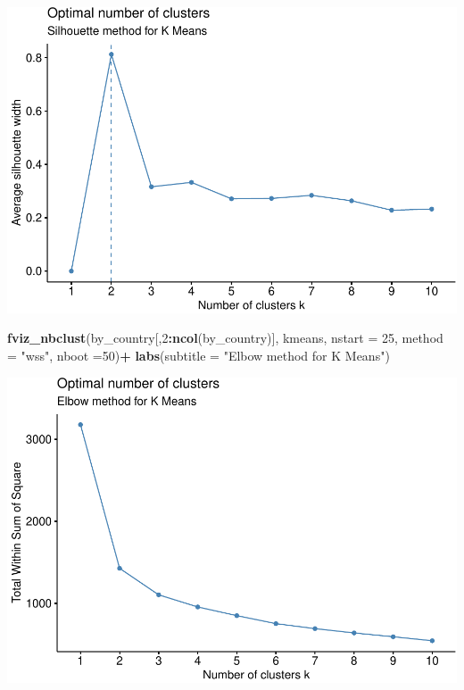 \documentclass[]{article}
\newenvironment{Shaded}{\begin{snugshade}}{\end{snugshade}}
\newcommand{\DataTypeTok}[1]{\textcolor[rgb]{0.13,0.29,0.53}{#1}}
\newcommand{\DecValTok}[1]{\textcolor[rgb]{0.00,0.00,0.81}{#1}}
\newcommand{\KeywordTok}[1]{\textcolor[rgb]{0.13,0.29,0.53}{\textbf{#1}}}
\newcommand{\NormalTok}[1]{#1}
\newcommand{\OperatorTok}[1]{\textcolor[rgb]{0.81,0.36,0.00}{\textbf{#1}}}
\newcommand{\StringTok}[1]{\textcolor[rgb]{0.31,0.60,0.02}{#1}}
\begin{document}
\includegraphics{eda_files/figure-latex/unnamed-chunk-14-1.pdf}

\begin{Shaded}
\begin{Highlighting}[]
\KeywordTok{fviz_nbclust}\NormalTok{(by_country[,}\DecValTok{2}\OperatorTok{:}\KeywordTok{ncol}\NormalTok{(by_country)], kmeans, }\DataTypeTok{nstart =} \DecValTok{25}\NormalTok{,  }\DataTypeTok{method =} \StringTok{"wss"}\NormalTok{, }
             \DataTypeTok{nboot =}\DecValTok{50}\NormalTok{)}\OperatorTok{+}\StringTok{ }\KeywordTok{labs}\NormalTok{(}\DataTypeTok{subtitle =} \StringTok{"Elbow method for K Means"}\NormalTok{)}
\end{Highlighting}
\end{Shaded}

\includegraphics{eda_files/figure-latex/unnamed-chunk-14-2.pdf}
\end{document}
